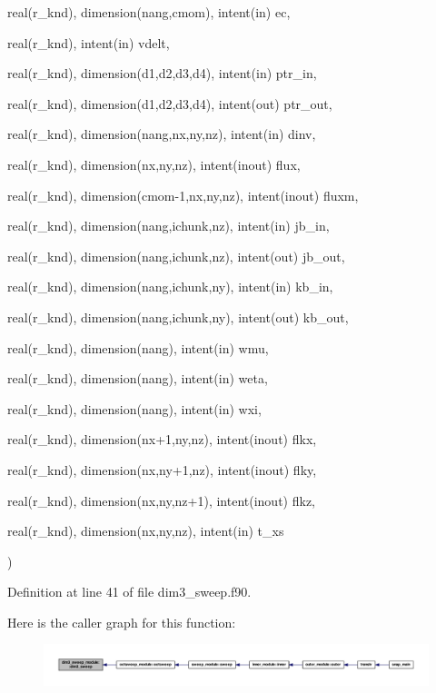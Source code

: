 {{\begin{DoxyParamCaption}
\item[{real(r\-\_\-knd), dimension(nang,cmom), intent(in)}]{ec, }
\item[{real(r\-\_\-knd), intent(in)}]{vdelt, }
\item[{real(r\-\_\-knd), dimension(d1,d2,d3,d4), intent(in)}]{ptr\-\_\-in, }
\item[{real(r\-\_\-knd), dimension(d1,d2,d3,d4), intent(out)}]{ptr\-\_\-out, }
\item[{real(r\-\_\-knd), dimension(nang,nx,ny,nz), intent(in)}]{dinv, }
\item[{real(r\-\_\-knd), dimension(nx,ny,nz), intent(inout)}]{flux, }
\item[{real(r\-\_\-knd), dimension(cmom-\/1,nx,ny,nz), intent(inout)}]{fluxm, }
\item[{real(r\-\_\-knd), dimension(nang,ichunk,nz), intent(in)}]{jb\-\_\-in, }
\item[{real(r\-\_\-knd), dimension(nang,ichunk,nz), intent(out)}]{jb\-\_\-out, }
\item[{real(r\-\_\-knd), dimension(nang,ichunk,ny), intent(in)}]{kb\-\_\-in, }
\item[{real(r\-\_\-knd), dimension(nang,ichunk,ny), intent(out)}]{kb\-\_\-out, }
\item[{real(r\-\_\-knd), dimension(nang), intent(in)}]{wmu, }
\item[{real(r\-\_\-knd), dimension(nang), intent(in)}]{weta, }
\item[{real(r\-\_\-knd), dimension(nang), intent(in)}]{wxi, }
\item[{real(r\-\_\-knd), dimension(nx+1,ny,nz), intent(inout)}]{flkx, }
\item[{real(r\-\_\-knd), dimension(nx,ny+1,nz), intent(inout)}]{flky, }
\item[{real(r\-\_\-knd), dimension(nx,ny,nz+1), intent(inout)}]{flkz, }
\item[{real(r\-\_\-knd), dimension(nx,ny,nz), intent(in)}]{t\-\_\-xs}
\end{DoxyParamCaption}
)}}\label{classdim3__sweep__module_a201ea00518f54fac4152d4ce277de50d}


Definition at line 41 of file dim3\-\_\-sweep.\-f90.



Here is the caller graph for this function\-:\nopagebreak
\begin{figure}[H]
\begin{center}
\leavevmode
\includegraphics[width=350pt]{classdim3__sweep__module_a201ea00518f54fac4152d4ce277de50d_icgraph}
\end{center}
\end{figure}




